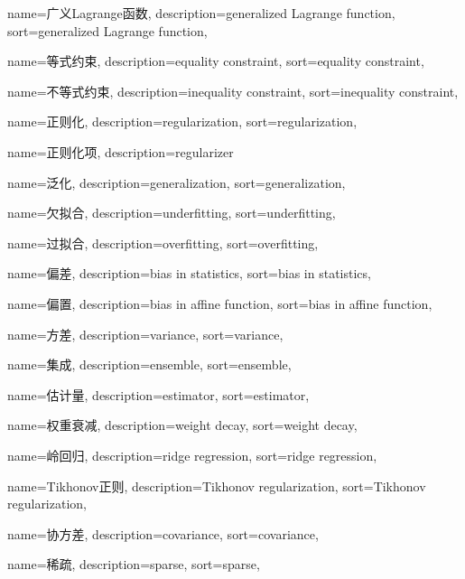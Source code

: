 {
  name=广义Lagrange函数,
  description={generalized Lagrange function},
  sort={generalized Lagrange function},
}

{
  name=等式约束,
  description={equality constraint},
  sort={equality constraint},
}

{
  name=不等式约束,
  description={inequality constraint},
  sort={inequality constraint},
}

{
  name=正则化,
  description={regularization},
  sort={regularization},
}

{
  name=正则化项,
  description={regularizer}
}

{
  name=泛化,
  description={generalization},
  sort={generalization},
}

{
  name=欠拟合,
  description={underfitting},
  sort={underfitting},
}

{
  name=过拟合,
  description={overfitting},
  sort={overfitting},
}

{
  name=偏差,
  description={bias in statistics},
  sort={bias in statistics},
}

{
  name=偏置,
  description={bias in affine function},
  sort={bias in affine function},
}

{
  name=方差,
  description={variance},
  sort={variance},
}

{
  name=集成,
  description={ensemble},
  sort={ensemble},
}

{
  name=估计量,
  description={estimator},
  sort={estimator},
}

{
  name=权重衰减,
  description={weight decay},
  sort={weight decay},
}

{
  name=岭回归,
  description={ridge regression},
  sort={ridge regression},
}

{
  name=Tikhonov正则,
  description={Tikhonov regularization},
  sort={Tikhonov regularization},
}

{
  name=协方差,
  description={covariance},
  sort={covariance},
}

{
  name=稀疏,
  description={sparse},
  sort={sparse},
}

